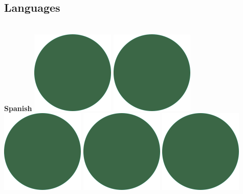 \documentclass[]{friggeri-cv-theme}
\begin{document}
\begin{aside}
  \section{Languages}
    \\
    \vspace{2mm}
    \textbf{Spanish}\hfill
    \includegraphics[scale=0.11]{img/IPSGreenDots.png}
    \includegraphics[scale=0.11]{img/IPSGreenDots.png}
    \includegraphics[scale=0.11]{img/IPSGreenDots.png}
    \includegraphics[scale=0.11]{img/IPSGreenDots.png}
    \includegraphics[scale=0.11]{img/IPSGreenDots.png}

\end{aside}
\end{document}
